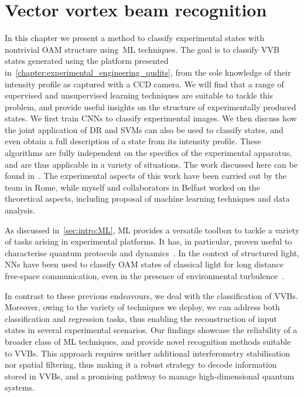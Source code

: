 
\chapter{Vector vortex beam recognition}
\label{chapter:ML_VVBs}

In this chapter we present a method to classify experimental states with nontrivial \ac{OAM} structure using~\acf{ML} techniques.
The goal is to classify \ac{VVB} states generated using the platform presented in~\cref{chapter:experimental_engineering_qudits}, from the sole knowledge of their intensity profile as captured with a CCD camera.
We will find that a range of supervised and unsupervised learning techniques are suitable to tackle this problem, and provide useful insights on the structure of experimentally produced states.
We first train \acp{CNN} to classify experimental images.
We then discuss how the joint application of \ac{DR} and \acp{SVM} can also be used to classify states, and even obtain a full description of a state from its intensity profile.
These algorithms are fully independent on the specifics of the experimental apparatus, and are thus applicable in a variety of situations.
The work discussed here can be found in~\cite{giordani2020machine}.
The experimental aspects of this work have been carried out by the team in Rome, while myself and collaborators in Belfast worked on the theoretical aspects, including proposal of machine learning techniques and data analysis.

As discussed in~\cref{sec:intro:ML}, \ac{ML} provides a versatile toolbox to tackle a variety of tasks arising in experimental platforms. It has, in particular, proven useful to characterise quantum protocols and dynamics~\cite{carrasquilla2019reconstructing,giordani2018experimental, agresti2019pattern,lumino2018experimental,rocchetto2019experimental,butler2018machine,fischer2006predicting,melnikov2018active,wang2017experimental}.
In the context of structured light, \acp{NN} have been used to classify \ac{OAM} states of classical light for long distance free-space communication, even in the presence of environmental turbulence~\cite{krenn2014communication,krenn2016twisted,doster2017machine,park2018demultiplexing,lohani2018turbulence,li2018joint}.

In contrast to these previous endeavours, we deal with the classification of \acp{VVB}. Moreover, owing to the variety of techniques we deploy, we can address both classification and regression tasks, thus enabling the reconstruction of input states in several experimental scenarios.
Our findings showcase the reliability of a broader class of ML techniques, and provide novel recognition methods suitable to \acp{VVB}.
This approach requires neither additional interferometry stabilisation nor spatial filtering, thus making it a robust strategy to decode information stored in \acp{VVB}, and a promising pathway to manage high-dimensional quantum systems. 

